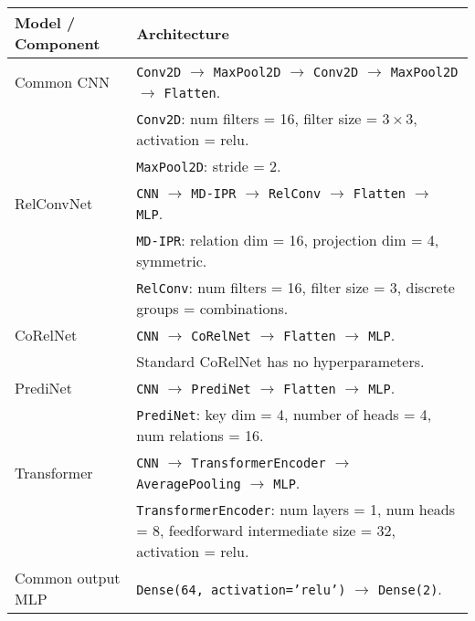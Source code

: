 \begin{tabular}{p{}p{}}
    \toprule
    Model / Component & Architecture                                                                                                                                                                                                                                                                                       \\ \midrule
    Common CNN        & \texttt{Conv2D} $\to$ \texttt{MaxPool2D} $\to$ \texttt{Conv2D} $\to$ \texttt{MaxPool2D} $\to$ \texttt{Flatten}. \\
    & \texttt{Conv2D}: num filters = 16, filter size = $3 \times 3$, activation = relu. \\
    & \texttt{MaxPool2D}: stride = 2. \\\hline
    RelConvNet        & \texttt{CNN} $\to$ \texttt{MD-IPR} $\to$ \texttt{RelConv} $\to$ \texttt{Flatten} $\to$ \texttt{MLP}. \\
    & \texttt{MD-IPR}: relation dim = 16, projection dim = 4, symmetric. \\
    & \texttt{RelConv}: num filters = 16, filter size = 3, discrete groups = combinations. \\\hline
    CoRelNet          & \texttt{CNN} $\to$ \texttt{CoRelNet} $\to$ \texttt{Flatten} $\to$ \texttt{MLP}. \\
    & Standard CoRelNet has no hyperparameters. \\\hline
    PrediNet          & \texttt{CNN} $\to$ \texttt{PrediNet} $\to$ \texttt{Flatten} $\to$ \texttt{MLP}. \\
    & \texttt{PrediNet}: key dim = 4, number of heads = 4, num relations = 16. \\\hline
    Transformer       & \texttt{CNN} $\to$ \texttt{TransformerEncoder} $\to$ \texttt{AveragePooling} $\to$ \texttt{MLP}. \\
    & \texttt{TransformerEncoder}: num layers = 1, num heads = 8, feedforward intermediate size = 32, activation = relu. \\\hline
    Common output MLP & \texttt{Dense(64, activation='relu')} $\to$ \texttt{Dense(2)}.                                                                                                                                                                                                              \\ \bottomrule
\end{tabular}